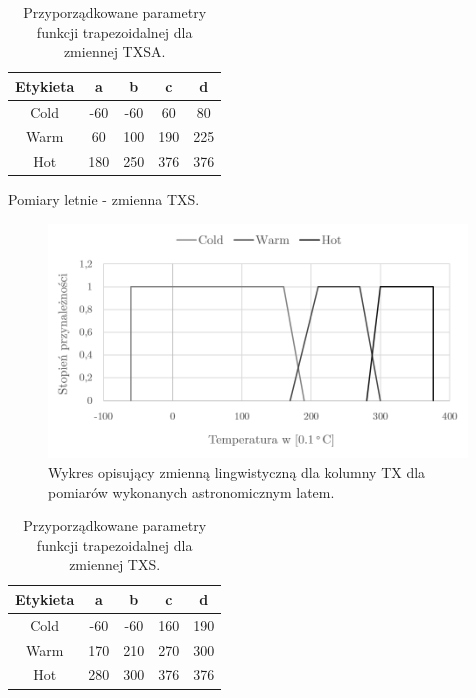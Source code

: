 \documentclass{classrep}
\begin{document}
\begin{table}[H]
	\centering
	\begin{tabular}{c c c c c} 
		\hline
		\textbf{Etykieta} & \textbf{a} & \textbf{b} & \textbf{c} & \textbf{d}\\ [0.5ex] 
		\hline
		\hline 
Cold	 &-60 & -60 & 60 & 80 \\
Warm & 60 & 100 & 190 & 225 \\
Hot	 & 180 & 250 & 376 & 376 \\
		\hline
	\end{tabular}
	\caption{Przyporządkowane parametry funkcji trapezoidalnej dla zmiennej TXSA.}
\end{table}

Pomiary letnie - zmienna TXS.
\begin{figure}[H]
	\centering
	\includegraphics[width=0.99\textwidth]{Pictures/TermsCharts/TX_L.png}
	\caption{Wykres opisujący zmienną lingwistyczną dla kolumny TX dla pomiarów wykonanych astronomicznym latem.}
\end{figure}

\begin{table}[H]
	\centering
	\begin{tabular}{c c c c c} 
		\hline
		\textbf{Etykieta} & \textbf{a} & \textbf{b} & \textbf{c} & \textbf{d}\\ [0.5ex] 
		\hline
		\hline 
Cold	 &-60 & -60 & 160 & 190 \\
Warm & 170 & 210 & 270 & 300 \\
Hot	 & 280 & 300 & 376 & 376 \\
		\hline
	\end{tabular}
	\caption{Przyporządkowane parametry funkcji trapezoidalnej dla zmiennej TXS.}
\end{table}

\clearpage
\end{document}
